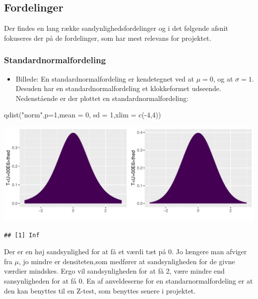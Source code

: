 \documentclass[
]{article}
\newenvironment{Shaded}{\begin{snugshade}}{\end{snugshade}}
\newcommand{\AttributeTok}[1]{\textcolor[rgb]{0.77,0.63,0.00}{#1}}
\newcommand{\DecValTok}[1]{\textcolor[rgb]{0.00,0.00,0.81}{#1}}
\newcommand{\FunctionTok}[1]{\textcolor[rgb]{0.00,0.00,0.00}{#1}}
\newcommand{\NormalTok}[1]{#1}
\newcommand{\SpecialCharTok}[1]{\textcolor[rgb]{0.00,0.00,0.00}{#1}}
\newcommand{\StringTok}[1]{\textcolor[rgb]{0.31,0.60,0.02}{#1}}
\providecommand{\tightlist}{%
  \setlength{\itemsep}{0pt}\setlength{\parskip}{0pt}}
\begin{document}
\hypertarget{fordelinger}{%
\subsection{Fordelinger}\label{fordelinger}}

Der findes en lang række sandynlighedsfordelinger og i det følgende
afsnit fokuseres der på de fordelinger, som har mest relevans for
projektet.

\hypertarget{standardnormalfordeling}{%
\subsubsection{Standardnormalfordeling}\label{standardnormalfordeling}}

\begin{itemize}
\tightlist
\item
  Billede: En standardnormalfordeling er kendetegnet ved at \(\mu=0\),
  og at \(\sigma = 1\). Desuden har en standardnormalfordeling et
  klokkeformet udseende. Nedenstående er der plottet en
  standardnormalfordeling:
\end{itemize}

\begin{Shaded}
\begin{Highlighting}[]
\FunctionTok{qdist}\NormalTok{(}\StringTok{"norm"}\NormalTok{,}\AttributeTok{p=}\DecValTok{1}\NormalTok{,}\AttributeTok{mean =} \DecValTok{0}\NormalTok{, }\AttributeTok{sd =} \DecValTok{1}\NormalTok{,}\AttributeTok{xlim =} \FunctionTok{c}\NormalTok{(}\SpecialCharTok{{-}}\DecValTok{4}\NormalTok{,}\DecValTok{4}\NormalTok{))}
\end{Highlighting}
\end{Shaded}

\includegraphics{TP2_files/figure-latex/unnamed-chunk-10-1.pdf}

\begin{verbatim}
## [1] Inf
\end{verbatim}

Der er en høj sandsynlighed for at få et værdi tæt på 0. Jo længere man
afviger fra \(\mu\), jo mindre er densiteten,som medfører at
sandsynligheden for de givne værdier mindskes. Ergo vil sandsynligheden
for at få 2, være mindre end sansynligheden for at få 0. En af
anveldeserne for en standarnormalfordeling er at den kan benyttes til en
Z-test, som benyttes senere i projektet.
\end{document}
